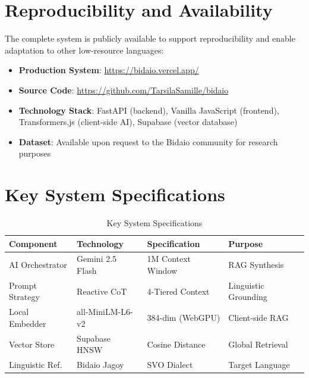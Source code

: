 \documentclass[12pt]{article}
\begin{document}



\section*{Reproducibility and Availability}
\noindent The complete system is publicly available to support reproducibility and enable adaptation to other low-resource languages:
\begin{itemize}
    \item \textbf{Production System}: \url{https://bidaio.vercel.app/}
    \item \textbf{Source Code}: \url{https://github.com/TarsilaSamille/bidaio}
    \item \textbf{Technology Stack}: FastAPI (backend), Vanilla JavaScript (frontend), Transformers.js (client-side AI), Supabase (vector database)
    \item \textbf{Dataset}: Available upon request to the Bidaio community for research purposes
\end{itemize}

\appendix
\section{Key System Specifications}

\begin{table}[ht]
\centering
\caption{Key System Specifications}
\label{tab:specs}
\begin{tabular}{l l l l}
\toprule
Component & Technology & Specification & Purpose \\
\midrule
AI Orchestrator & Gemini 2.5 Flash & 1M Context Window & RAG Synthesis \\
Prompt Strategy & Reactive CoT & 4-Tiered Context & Linguistic Grounding \\
Local Embedder & all-MiniLM-L6-v2 & 384-dim (WebGPU) & Client-side RAG \\
Vector Store & Supabase HNSW & Cosine Distance & Global Retrieval \\
Linguistic Ref. & Bidaio Jagoy & SVO Dialect & Target Language \\
\bottomrule
\end{tabular}
\end{table}
\end{document}
